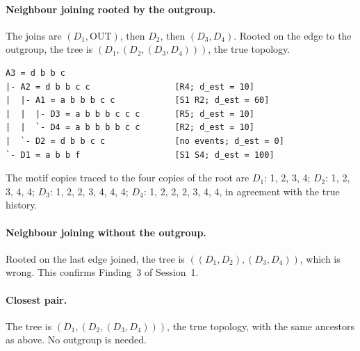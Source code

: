 \documentclass[11pt,a4paper]{article}
\begin{document}
\paragraph{Neighbour joining rooted by the outgroup.} The joins are $(D_1,\mathrm{OUT})$, then
$D_2$, then $(D_3,D_4)$. Rooted on the edge to the outgroup, the tree is
$(D_1,(D_2,(D_3,D_4)))$, the true topology.
\begin{lstlisting}
A3 = d b b c
|- A2 = d b b c c                 [R4; d_est = 10]
|  |- A1 = a b b b c c            [S1 R2; d_est = 60]
|  |  |- D3 = a b b b c c c       [R5; d_est = 10]
|  |  `- D4 = a b b b b c c       [R2; d_est = 10]
|  `- D2 = d b b c c              [no events; d_est = 0]
`- D1 = a b b f                   [S1 S4; d_est = 100]
\end{lstlisting}
The motif copies traced to the four copies of the root are
$D_1$: 1, 2, 3, 4; $D_2$: 1, 2, 3, 4, 4; $D_3$: 1, 2, 2, 3, 4, 4, 4; $D_4$: 1, 2, 2, 2, 3, 4, 4,
in agreement with the true history.

\paragraph{Neighbour joining without the outgroup.} Rooted on the last edge joined, the tree is
$((D_1,D_2),(D_3,D_4))$, which is wrong. This confirms Finding~3 of Session~1.

\paragraph{Closest pair.} The tree is $(D_1,(D_2,(D_3,D_4)))$, the true topology, with the same
ancestors as above. No outgroup is needed.
\end{document}
